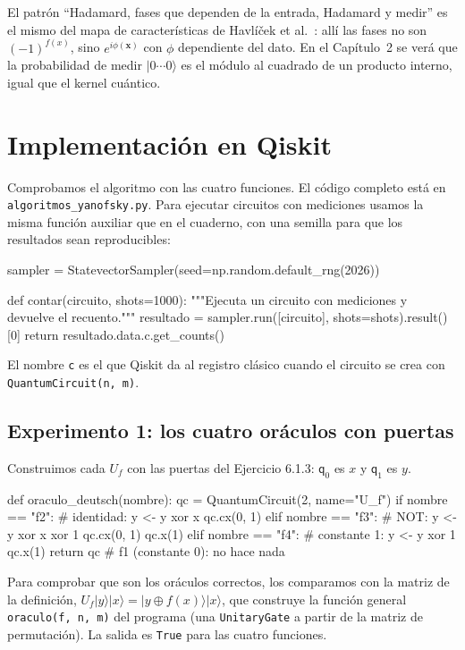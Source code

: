 \documentclass[11pt, a4paper, twoside, openright]{report}
\providecommand{\ket}[1]{|#1\rangle}
\begin{document}
\begin{tfg}
El patrón ``Hadamard, fases que dependen de la entrada, Hadamard y medir'' es el mismo del mapa de características de Havlíček et al.\ \cite{havlicek2019supervised}: allí las fases no son $(-1)^{f(x)}$, sino $e^{i\phi(\mathbf{x})}$ con $\phi$ dependiente del dato. En el Capítulo~2 se verá que la probabilidad de medir $\ket{0\cdots0}$ es el módulo al cuadrado de un producto interno, igual que el kernel cuántico.
\end{tfg}

\cleardoublepage
\section{Implementación en Qiskit}

\noindent Comprobamos el algoritmo con las cuatro funciones. El código completo está en \texttt{algoritmos\_yanofsky.py}. Para ejecutar circuitos con mediciones usamos la misma función auxiliar que en el cuaderno, con una semilla para que los resultados sean reproducibles:
\begin{codigo}
sampler = StatevectorSampler(seed=np.random.default_rng(2026))

def contar(circuito, shots=1000):
    """Ejecuta un circuito con mediciones y devuelve el recuento."""
    resultado = sampler.run([circuito], shots=shots).result()[0]
    return resultado.data.c.get_counts()
\end{codigo}
\noindent El nombre \texttt{c} es el que Qiskit da al registro clásico cuando el circuito se crea con \texttt{QuantumCircuit(n, m)}.

\subsection{Experimento 1: los cuatro oráculos con puertas}

\noindent Construimos cada $U_f$ con las puertas del Ejercicio 6.1.3: $\mathsf{q}_0$ es $x$ y $\mathsf{q}_1$ es $y$.
\begin{codigo}
def oraculo_deutsch(nombre):
    qc = QuantumCircuit(2, name="U_f")
    if nombre == "f2":      # identidad: y <- y xor x
        qc.cx(0, 1)
    elif nombre == "f3":    # NOT: y <- y xor x xor 1
        qc.cx(0, 1)
        qc.x(1)
    elif nombre == "f4":    # constante 1: y <- y xor 1
        qc.x(1)
    return qc               # f1 (constante 0): no hace nada
\end{codigo}
\noindent Para comprobar que son los oráculos correctos, los comparamos con la matriz de la definición, $U_f\ket{y}\ket{x} = \ket{y\oplus f(x)}\ket{x}$, que construye la función general \texttt{oraculo(f, n, m)} del programa (una \texttt{UnitaryGate} a partir de la matriz de permutación). La salida es \texttt{True} para las cuatro funciones.
\end{document}

